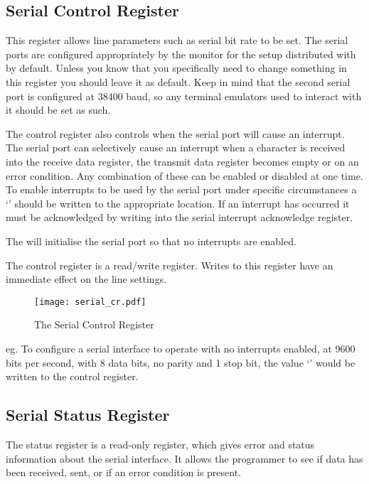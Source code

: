 \newpage
\subsection{Serial Control Register}

This register allows line parameters such as serial bit rate to be
set. The serial ports are configured appropriately by the monitor for
the setup distributed with  by default. Unless you know
that you specifically need to change something in this register you
should leave it as default. Keep in mind that the second serial port
is configured at 38400 baud, so any terminal emulators used to interact
with it should be set as such.

The control register also controls when the serial port will cause an
interrupt. The serial port can selectively cause an interrupt when a
character is received into the receive data register, the transmit
data register becomes empty or on an error condition. Any combination of
these can be enabled or disabled at one time. To enable interrupts to
be used by the serial port under specific circumstances a `'
should be written to the appropriate location. If an interrupt has
occurred it must be acknowledged by writing into the serial interrupt
acknowledge register.

The \WRAMPmon will initialise the serial port so that no
interrupts are enabled.

The control register is a read/write register. Writes to this register
have an immediate effect on the line settings.

\begin{figure}[h]
\begin{center}
\texttt{[image: serial\_cr.pdf]}
\caption{The Serial Control Register}
\label{serial_cr_pic}
\end{center}
\end{figure}

\noindent
eg. To configure a serial interface to operate with no interrupts
enabled, at 9600 bits per second, with 8 data bits, no parity and 1
stop bit, the value `' would be written to the
control register.

\subsection{Serial Status Register}

The status register is a read-only register, which gives error and
status information about the serial interface. It allows the
programmer to see if data has been received, sent, or if an error
condition is present.

